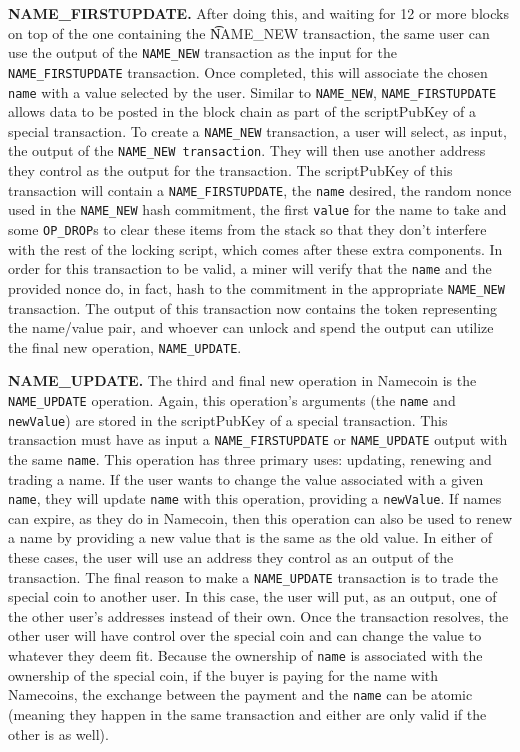 {\bf NAME\_FIRSTUPDATE.}
After doing this, and waiting for 12 or more blocks on top of the one containing the {\t NAME\_NEW} transaction, the same user can use the output of the {\tt NAME\_NEW} transaction as the input for the {\tt NAME\_FIRSTUPDATE} transaction. Once completed, this will associate the chosen {\tt name} with a value selected by the user. Similar to {\tt NAME\_NEW}, {\tt NAME\_FIRSTUPDATE} allows data to be posted in the block chain as part of the scriptPubKey of a special transaction. 
To create a {\tt NAME\_NEW} transaction, a user will select, as input, the output of the {\tt NAME\_NEW transaction}. They will then use another address they control as the output for the transaction. The scriptPubKey of this transaction will contain a {\tt NAME\_FIRSTUPDATE}, the {\tt name} desired, the random nonce used in the {\tt NAME\_NEW} hash commitment, the first {\tt value} for the name to take and some {\tt OP\_DROP}s to clear these items from the stack so that they don't interfere with the rest of the locking script, which comes after these extra components. In order for this transaction to be valid, a miner will verify that the {\tt name} and the provided nonce do, in fact, hash to the commitment in the appropriate {\tt NAME\_NEW} transaction. The output of this transaction now contains the token representing the name/value pair, and whoever can unlock and spend the output can utilize the final new operation, {\tt NAME\_UPDATE}.

{\bf NAME\_UPDATE.}
The third and final new operation in Namecoin is the {\tt NAME\_UPDATE} operation. Again, this operation's arguments (the {\tt name} and {\tt newValue}) are stored in the scriptPubKey of a special transaction. This transaction must have as input a {\tt NAME\_FIRSTUPDATE} or {\tt NAME\_UPDATE} output with the same {\tt name}. This operation has three primary uses: updating, renewing and trading a name. If the user wants to change the value associated with a given {\tt name}, they will update {\tt name} with this operation, providing a {\tt newValue}. If names can expire, as they do in Namecoin, then this operation can also be used to renew a name by providing a new value that is the same as the old value. In either of these cases, the user will use an address they control as an output of the transaction. The final reason to make a {\tt NAME\_UPDATE} transaction is to trade the special coin to another user. In this case, the user will put, as an output, one of the other user's addresses instead of their own. Once the transaction resolves, the other user will have control over the special coin and can change the value to whatever they deem fit. Because the ownership of {\tt name} is associated with the ownership of the special coin, if the buyer is paying for the name with Namecoins, the exchange between the payment and the {\tt name} can be atomic (meaning they happen in the same transaction and either are only valid if the other is as well). 

